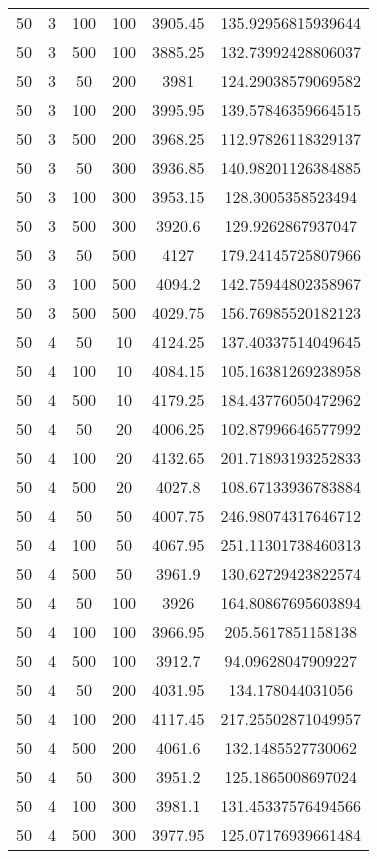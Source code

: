 {\begin{longtabu}{S
S
S
S
S[round-mode=places, round-precision=0]
S[round-mode=places, round-precision=0]}
50 & 3 & 100 & 100 & 3905.45 & 135.92956815939644 \\
50 & 3 & 500 & 100 & 3885.25 & 132.73992428806037 \\
50 & 3 & 50 & 200 & 3981 & 124.29038579069582 \\
50 & 3 & 100 & 200 & 3995.95 & 139.57846359664515 \\
50 & 3 & 500 & 200 & 3968.25 & 112.97826118329137 \\
50 & 3 & 50 & 300 & 3936.85 & 140.98201126384885 \\
50 & 3 & 100 & 300 & 3953.15 & 128.3005358523494 \\
50 & 3 & 500 & 300 & 3920.6 & 129.9262867937047 \\
50 & 3 & 50 & 500 & 4127 & 179.24145725807966 \\
50 & 3 & 100 & 500 & 4094.2 & 142.75944802358967 \\
50 & 3 & 500 & 500 & 4029.75 & 156.76985520182123 \\
50 & 4 & 50 & 10 & 4124.25 & 137.40337514049645 \\
50 & 4 & 100 & 10 & 4084.15 & 105.16381269238958 \\
50 & 4 & 500 & 10 & 4179.25 & 184.43776050472962 \\
50 & 4 & 50 & 20 & 4006.25 & 102.87996646577992 \\
50 & 4 & 100 & 20 & 4132.65 & 201.71893193252833 \\
50 & 4 & 500 & 20 & 4027.8 & 108.67133936783884 \\
50 & 4 & 50 & 50 & 4007.75 & 246.98074317646712 \\
50 & 4 & 100 & 50 & 4067.95 & 251.11301738460313 \\
50 & 4 & 500 & 50 & 3961.9 & 130.62729423822574 \\
50 & 4 & 50 & 100 & 3926 & 164.80867695603894 \\
50 & 4 & 100 & 100 & 3966.95 & 205.5617851158138 \\
50 & 4 & 500 & 100 & 3912.7 & 94.09628047909227 \\
50 & 4 & 50 & 200 & 4031.95 & 134.178044031056 \\
50 & 4 & 100 & 200 & 4117.45 & 217.25502871049957 \\
50 & 4 & 500 & 200 & 4061.6 & 132.1485527730062 \\
50 & 4 & 50 & 300 & 3951.2 & 125.1865008697024 \\
50 & 4 & 100 & 300 & 3981.1 & 131.45337576494566 \\
50 & 4 & 500 & 300 & 3977.95 & 125.07176939661484 \\

\end{longtabu}}
